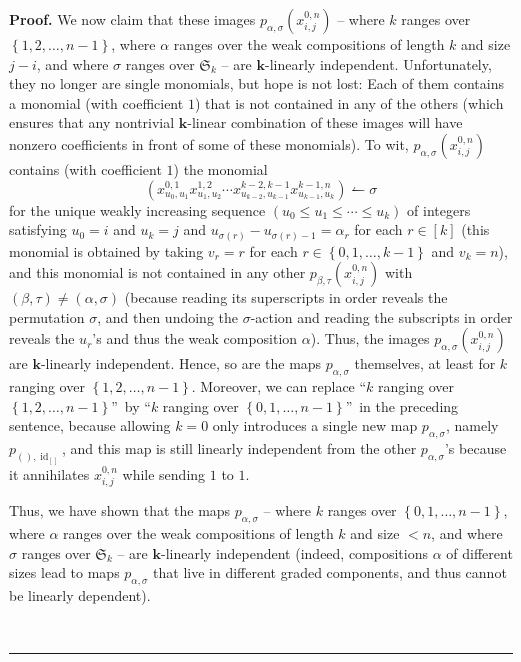 \documentclass[numbers=enddot,12pt,final,onecolumn,notitlepage]{scrartcl}%
\theoremstyle{definition}
\newenvironment{proof}[1][Proof]{\noindent\textbf{#1.} }{\ \rule{0.5em}{0.5em}}
\begin{document}
\begin{proof}
We now claim that these images $p_{\alpha,\sigma}\left(  x_{i,j}^{0,n}\right)
$ -- where $k$ ranges over $\left\{  1,2,\ldots,n-1\right\}  $, where $\alpha$
ranges over the weak compositions of length $k$ and size $j-i$, and where
$\sigma$ ranges over $\mathfrak{S}_{k}$ -- are $\mathbf{k}$-linearly
independent. Unfortunately, they no longer are single monomials, but hope is
not lost: Each of them contains a monomial (with coefficient $1$) that is not
contained in any of the others (which ensures that any nontrivial $\mathbf{k}%
$-linear combination of these images will have nonzero coefficients in front
of some of these monomials). To wit, $p_{\alpha,\sigma}\left(  x_{i,j}%
^{0,n}\right)  $ contains (with coefficient $1$) the monomial%
\[
\left(  x_{u_{0},u_{1}}^{0,1}x_{u_{1},u_{2}}^{1,2}\cdots x_{u_{k-2},u_{k-1}%
}^{k-2,k-1}x_{u_{k-1},u_{k}}^{k-1,n}\right)  \leftharpoonup\sigma
\]
for the unique weakly increasing sequence $\left(  u_{0}\leq u_{1}\leq
\cdots\leq u_{k}\right)  $ of integers satisfying $u_{0}=i$ and $u_{k}=j$ and
$u_{\sigma\left(  r\right)  }-u_{\sigma\left(  r\right)  -1}=\alpha_{r}$ for
each $r\in\left[  k\right]  $ (this monomial is obtained by taking $v_{r}=r$
for each $r\in\left\{  0,1,\ldots,k-1\right\}  $ and $v_{k}=n$), and this
monomial is not contained in any other $p_{\beta,\tau}\left(  x_{i,j}%
^{0,n}\right)  $ with $\left(  \beta,\tau\right)  \neq\left(  \alpha
,\sigma\right)  $ (because reading its superscripts in order reveals the
permutation $\sigma$, and then undoing the $\sigma$-action and reading the
subscripts in order reveals the $u_{r}$'s and thus the weak composition
$\alpha$). Thus, the images $p_{\alpha,\sigma}\left(  x_{i,j}^{0,n}\right)  $
are $\mathbf{k}$-linearly independent. Hence, so are the maps $p_{\alpha
,\sigma}$ themselves, at least for $k$ ranging over $\left\{  1,2,\ldots
,n-1\right\}  $. Moreover, we can replace \textquotedblleft$k$ ranging over
$\left\{  1,2,\ldots,n-1\right\}  $\textquotedblright\ by \textquotedblleft$k$
ranging over $\left\{  0,1,\ldots,n-1\right\}  $\textquotedblright\ in the
preceding sentence, because allowing $k=0$ only introduces a single new map
$p_{\alpha,\sigma}$, namely $p_{\left(  {}\right)  ,\operatorname*{id}%
\nolimits_{\left[  {}\right]  }}$, and this map is still linearly independent
from the other $p_{\alpha,\sigma}$'s because it annihilates $x_{i,j}^{0,n}$
while sending $1$ to $1$.

Thus, we have shown that the maps $p_{\alpha,\sigma}$ -- where $k$ ranges over
$\left\{  0,1,\ldots,n-1\right\}  $, where $\alpha$ ranges over the weak
compositions of length $k$ and size $<n$, and where $\sigma$ ranges over
$\mathfrak{S}_{k}$ -- are $\mathbf{k}$-linearly independent (indeed,
compositions $\alpha$ of different sizes lead to maps $p_{\alpha,\sigma}$ that
live in different graded components, and thus cannot be linearly dependent).


\end{proof}
\end{document}
